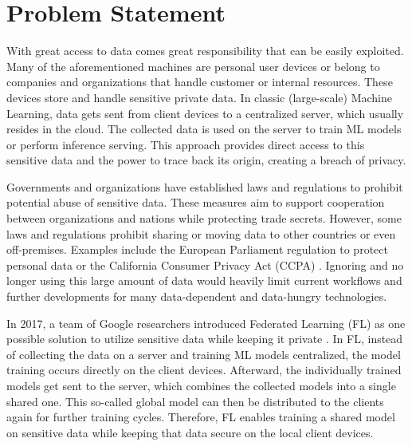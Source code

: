 \section{Problem Statement}\label{section:problem_statement}

With great access to data comes great responsibility that can be easily exploited.
Many of the aforementioned machines are personal user devices or belong to companies and organizations that handle customer or internal resources.
These devices store and handle sensitive private data.
In classic (large-scale) Machine Learning, data gets sent from client devices to a centralized server, which usually resides in the cloud.
The collected data is used on the server to train ML models or perform inference serving.
This approach provides direct access to this sensitive data and the power to trace back its origin, creating a breach of privacy.

Governments and organizations have established laws and regulations to prohibit potential abuse of sensitive data.
These measures aim to support cooperation between organizations and nations while protecting trade secrets.
However, some laws and regulations prohibit sharing or moving data to other countries or even off-premises.
Examples include the European Parliament regulation to protect personal data \cite{eu_regulation} or the California Consumer Privacy Act (CCPA) \cite{california_consumer_privacy_act}.
Ignoring and no longer using this large amount of data would heavily limit current workflows and further developments for many data-dependent and data-hungry technologies.

In 2017, a team of Google researchers introduced Federated Learning (FL) as one possible solution to utilize sensitive data while keeping it private \cite{paper:original_fl}.
In FL, instead of collecting the data on a server and training ML models centralized, the model training occurs directly on the client devices.
Afterward, the individually trained models get sent to the server, which combines the collected models into a single shared one.
This so-called global model can then be distributed to the clients again for further training cycles.
Therefore, FL enables training a shared model on sensitive data while keeping that data secure on the local client devices. 

